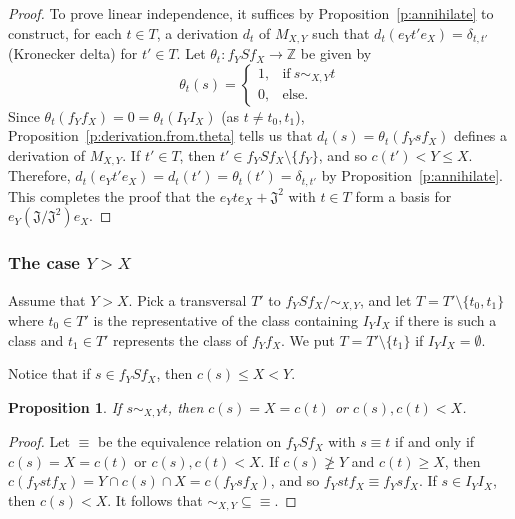\documentclass[reqno,11pt]{amsart}
\newtheorem{Prop}[Thm]{Proposition}
\numberwithin{equation}{section}
\begin{document}
\begin{proof}
To prove linear independence, it suffices by Proposition~\ref{p:annihilate} to construct, for each $t\in T$, a derivation $d_t$ of $M_{X,Y}$ such that $d_t(e_Yt'e_X) = \delta_{t,t'}$ (Kronecker delta) for $t'\in T$.   Let $\theta_t\colon f_YSf_X\to \mathbb Z$ be given by 
    \[\theta_t(s) = \begin{cases}
        1, & \text{if}\ s\sim_{X,Y} t\\ 0, & \text{else.}
                    \end{cases}\]
Since $\theta_t(f_Yf_X) = 0=\theta_t(I_YI_X)$ (as $t\neq t_0,t_1$), Proposition~\ref{p:derivation.from.theta} tells us that $d_t(s) = \theta_t(f_Ysf_X)$ defines a derivation of $M_{X,Y}$.  If $t'\in T$, then $t'\in f_YSf_X\setminus \{f_Y\}$, and so $c(t')<Y\leq X$.  Therefore, $d_t(e_Yt'e_X) = d_t(t') = \theta_t(t') = \delta_{t,t'}$ by Proposition~\ref{p:annihilate}.  This completes the proof that the $e_Yte_X+\mathfrak J^2$ with $t\in T$ form a basis for $e_Y(\mathfrak J/\mathfrak J^2)e_X$.
\end{proof}

\subsubsection{The case $Y>X$}  Assume that $Y>X$.
Pick a transversal $T'$ to $f_YSf_X/{\sim_{X,Y}}$, and let $T=T'\setminus \{t_0,t_1\}$ where $t_0\in T'$ is the representative of the class containing $I_YI_X$  if there is such a class and $t_1\in T'$ represents the class of $f_Yf_X$. We put $T=T'\setminus \{t_1\}$ if $I_YI_X=\emptyset$.

Notice that if $s\in f_YSf_X$, then $c(s)\leq X<Y$.

\begin{Prop}\label{p:c-saturated}
If $s\sim_{X,Y} t$, then $c(s)=X=c(t)$ or $c(s),c(t)<X$.
\end{Prop}
\begin{proof}
    Let $\equiv$ be the equivalence relation on $f_YSf_X$ with $s\equiv t$ if and only if $c(s)=X=c(t)$ or $c(s),c(t)<X$.  If $c(s)\ngeq Y$ and $c(t)\geq X$, then $c(f_Ystf_X) = Y\cap c(s)\cap X = c(f_Ysf_X)$, and so $f_Ystf_X\equiv f_Ysf_X$.   If $s\in I_YI_X$, then $c(s)< X$. It follows that 
    ${\sim_{X,Y}}\subseteq {\equiv}$.
\end{proof}
\end{document}
